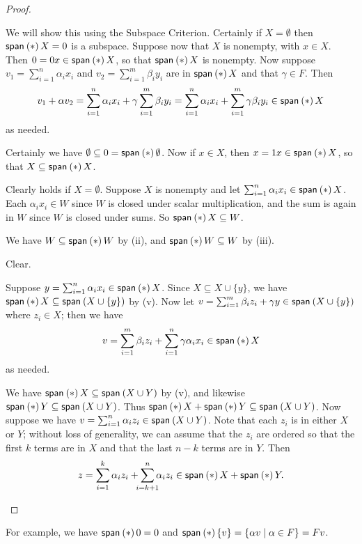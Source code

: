 \documentclass{memoir}
\begin{document}
\begin{proof} \mbox{}
\begin{enumerate*}
\item We will show this using the Subspace Criterion. Certainly if $X = \emptyset$ then $\operatorname{\mathsf{span}}_{}\left(*\right){X} = 0$ is a subspace. Suppose now that $X$ is nonempty, with $x \in X$. Then $0 = 0x \in \operatorname{\mathsf{span}}_{}\left(*\right){X}$, so that $\operatorname{\mathsf{span}}_{}\left(*\right){X}$ is nonempty. Now suppose $v_1 = \sum_{i=1}^n \alpha_i x_i$ and $v_2 = \sum_{i=1}^m \beta_i y_i$ are in $\operatorname{\mathsf{span}}_{}\left(*\right){X}$ and that $\gamma \in F$. Then \[ v_1 + \alpha v_2 = \sum_{i=1}^n \alpha_i x_i + \gamma \sum_{i=1}^m \beta_i y_i = \sum_{i=1}^n \alpha_i x_i + \sum_{i=1}^m \gamma \beta_i y_i \in \operatorname{\mathsf{span}}_{}\left(*\right){X} \] as needed.
\item Certainly we have $\emptyset \subseteq 0 = \operatorname{\mathsf{span}}_{}\left(*\right){\emptyset}$. Now if $x \in X$, then $x = 1x \in \operatorname{\mathsf{span}}_{}\left(*\right){X}$, so that $X \subseteq \operatorname{\mathsf{span}}_{}\left(*\right){X}$.
\item Clearly holds if $X = \emptyset$. Suppose $X$ is nonempty and let $\sum_{i=1}^n \alpha_i x_i \in \operatorname{\mathsf{span}}_{}\left(*\right){X}$. Each $\alpha_i x_i \in W$ since $W$ is closed under scalar multiplication, and the sum is again in $W$ since $W$ is closed under sums. So $\operatorname{\mathsf{span}}_{}\left(*\right){X} \subseteq W$.
\item We have $W \subseteq \operatorname{\mathsf{span}}_{}\left(*\right){W}$ by (ii), and $\operatorname{\mathsf{span}}_{}\left(*\right){W} \subseteq W$ by (iii).
\item Clear.
\item Suppose $y = \sum_{i=1}^n \alpha_i x_i \in \operatorname{\mathsf{span}}_{}\left(*\right){X}$. Since $X \subseteq X \cup \{y\}$, we have $\operatorname{\mathsf{span}}_{}\left(*\right){X} \subseteq \operatorname{\mathsf{span}}_{}\left(X \cup\{y\}\right)$ by (v). Now let $v = \sum_{i=1}^m \beta_i z_i + \gamma y \in \operatorname{\mathsf{span}}_{}\left(X \cup \{y\}\right)$ where $z_i \in X$; then we have \[v = \sum_{i=1}^m \beta_i z_i + \sum_{i=1}^n \gamma \alpha_i x_i \in \operatorname{\mathsf{span}}_{}\left(*\right){X}\] as needed.
\item We have $\operatorname{\mathsf{span}}_{}\left(*\right){X} \subseteq \operatorname{\mathsf{span}}_{}\left(X \cup Y\right)$ by (v), and likewise $\operatorname{\mathsf{span}}_{}\left(*\right){Y} \subseteq \operatorname{\mathsf{span}}_{}\left(X \cup Y\right)$. Thus $\operatorname{\mathsf{span}}_{}\left(*\right){X} + \operatorname{\mathsf{span}}_{}\left(*\right){Y} \subseteq \operatorname{\mathsf{span}}_{}\left(X \cup Y\right)$. Now suppose we have $v = \sum_{i=1}^n \alpha_i z_i \in \operatorname{\mathsf{span}}_{}\left(X \cup Y\right)$. Note that each $z_i$ is in either $X$ or $Y$; without loss of generality, we can assume that the $z_i$ are ordered so that the first $k$ terms are in $X$ and that the last $n-k$ terms are in $Y$. Then \[z = \sum_{i=1}^k \alpha_i z_i + \sum_{\mathclap{i=k+1}}^n \alpha_i z_i \in \Span*{X} + \Span*{Y}. \qedhere \]
\end{enumerate*}
\end{proof}

For example, we have $\operatorname{\mathsf{span}}_{}\left(*\right){0} = 0$ and $\operatorname{\mathsf{span}}_{}\left(*\right){\{v\}} = \{\alpha v \mid \alpha \in F\} = Fv$.
\end{document}
